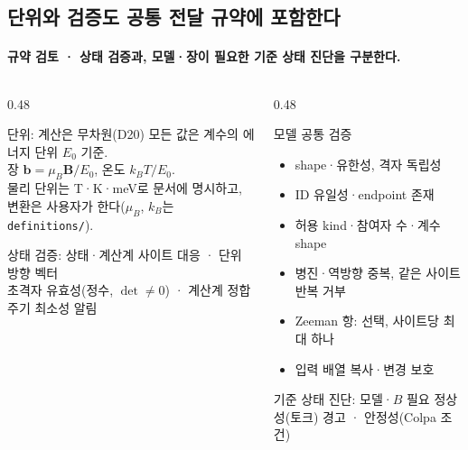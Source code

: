\subsection{단위와 검증도 공통 전달 규약에 포함한다}\label{validation}
\begingroup%
  \framesubtitle{규약 검토 · 상태 검증과, 모델·장이 필요한 기준 상태 진단을 구분한다.}
  \begin{columns}[T,onlytextwidth]
    \begin{column}{0.48\textwidth}
      \begin{block}{단위: 계산은 무차원(D20)}
        모든 값은 계수의 에너지 단위 $E_0$ 기준.\\
        장 $\mathbf b=\mu_B\mathbf B/E_0$, 온도 $k_BT/E_0$.\\[0.4em]
        물리 단위는 T·K·meV로 문서에 명시하고,
        변환은 사용자가 한다($\mu_B$, $k_B$는 \texttt{definitions/}).
      \end{block}
      \begin{block}{상태 검증: 상태·계산계}
        사이트 대응 · 단위 방향 벡터\\
        초격자 유효성(정수, $\det\neq0$) · 계산계 정합\\
        주기 최소성 알림
      \end{block}
    \end{column}
    \begin{column}{0.48\textwidth}
      \begin{block}{모델 공통 검증}
        \begin{itemize}
          \item shape·유한성, 격자 독립성
          \item ID 유일성·endpoint 존재
          \item 허용 kind·참여자 수·계수 shape
          \item 병진·역방향 중복, 같은 사이트 반복 거부
          \item Zeeman 항: 선택, 사이트당 최대 하나
          \item 입력 배열 복사·변경 보호
        \end{itemize}
      \end{block}
      \begin{block}{기준 상태 진단: 모델·$B$ 필요}
        정상성(토크) 경고 · 안정성(Colpa 조건)
      \end{block}
    \end{column}
  \end{columns}
\endgroup


